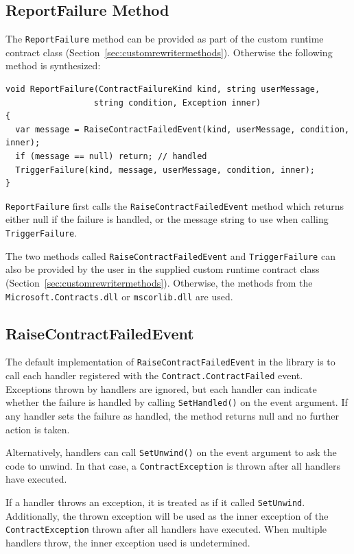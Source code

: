 \documentclass{article}
\newcommand{\code}[1]{\lstinline{#1}}
\begin{document}
\subsection{ReportFailure Method}
The \code{ReportFailure} method can be provided as part of the custom
runtime contract class (Section~\ref{sec:customrewritermethods}). Otherwise the following method
is synthesized: 
\begin{lstlisting}
void ReportFailure(ContractFailureKind kind, string userMessage,
                  string condition, Exception inner) 
{
  var message = RaiseContractFailedEvent(kind, userMessage, condition, inner);
  if (message == null) return; // handled
  TriggerFailure(kind, message, userMessage, condition, inner);
}
\end{lstlisting}
\code{ReportFailure} first calls the \code{RaiseContractFailedEvent} method which returns
either null if the failure is handled, or the message string to use
when calling \code{TriggerFailure}. 

The two methods called \code{RaiseContractFailedEvent} and
\code{TriggerFailure} can also be provided by the user in the supplied
custom runtime contract class
(Section~\ref{sec:customrewritermethods}). Otherwise, the methods from
the \code{Microsoft.Contracts.dll} or \code{mscorlib.dll} are used.

\subsection{RaiseContractFailedEvent}
The default implementation of \code{RaiseContractFailedEvent} in the library is to
call each handler registered with the \code{Contract.ContractFailed}
event. Exceptions thrown by handlers are ignored, but each handler can
indicate whether the failure is handled by calling \code{SetHandled()}
on the event argument. If any handler sets the failure as handled,
the method returns null and no further action is taken.

Alternatively, handlers can call \code{SetUnwind()} on the event argument to ask the code to
unwind. In that case, a \code{ContractException} is thrown after all
handlers have executed.

If a handler throws an exception, it is treated as if it called
\code{SetUnwind}. Additionally, the thrown exception will be used as
the inner exception of the \code{ContractException} thrown after all
handlers have executed. When multiple handlers throw, the inner
exception used is undetermined. 
\end{document}
